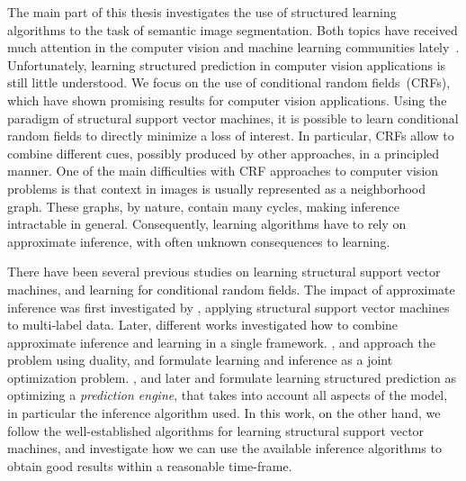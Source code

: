 The main part of this thesis investigates the use of structured learning~\citep{taskar2003max, tsochantaridis2006large}
algorithms to the task of semantic image segmentation. Both topics have received
much attention in the computer vision and machine learning communities
lately~\citep{ladicky2009associative, krahenbuhl2012efficient,
branson2013efficient, blake2011markov}.
Unfortunately, learning structured prediction in computer vision applications
is still little understood.
We focus on the use of conditional random fields~(CRFs), which have shown
promising  results for computer vision applications. Using the paradigm of structural
support vector machines, it is possible to learn conditional random fields to
directly minimize a loss of interest. In particular, CRFs
allow to combine different cues, possibly produced by other approaches, in a
principled manner. One of the main difficulties with CRF approaches to computer
vision problems is that context in images is usually represented as a
neighborhood graph.  These graphs, by nature, contain many cycles, making
inference intractable in general. Consequently, learning algorithms have to
rely on approximate inference, with often unknown consequences to learning.

There have been several previous studies on learning structural support vector
machines, and learning for conditional random fields. The impact of approximate
inference was first investigated by \citet{finley2008training}, applying
structural support vector machines to multi-label data. Later, different works
investigated how to combine approximate inference and learning in a single
framework. \citet{meshi2010learning, komodakis2011efficient}, and
\citet{hazan2010primal} approach the problem using duality, and formulate
learning and inference as a joint optimization problem.
\citet{stoyanov2011empirical}, and later \citet{jancsarylearning} and
\citet{krahenbuhlparameter} formulate learning structured prediction as
optimizing a \emph{prediction engine}, that takes into account all aspects of
the model, in particular the inference algorithm used.
In this work, on the other hand, we follow the well-established algorithms for
learning structural support vector machines, and investigate how we can use the
available inference algorithms to obtain good results within a reasonable
time-frame.

